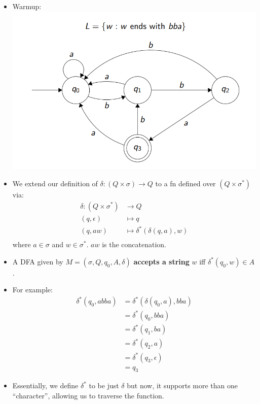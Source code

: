 \documentclass[12pt]{article}
\begin{document}
\begin{itemize}
    \item Warmup:\\
        \includegraphics[scale=0.5]{warmup.png}\\
    \item We extend our definition of $\delta : (Q \times \sigma) \rightarrow Q$ to a fn defined over $(Q \times \sigma^*)$ via:
        \begin{align*}
            \delta : (Q \times \sigma^*) &\rightarrow Q \\
            (q, \epsilon) &\mapsto q \\
            (q, aw) &\mapsto \delta^*(\delta(q, a), w) \\
        \end{align*}
    where $a \in \sigma$ and $w \in \sigma^*$.  $aw$ is the concatenation.
\item A DFA given by $M = (\sigma, Q, q_0, A, \delta)$ \textbf{accepts a string} $w$ iff $\delta^*(q_0, w) \in A$.
    \item For example:
        \begin{align*}
            \delta^*(q_0, abba) &= \delta^*(\delta(q_0, a), bba)\\
            &= \delta^*(q_0, bba) \\
            &= \delta^*(q_1, ba) \\
            &= \delta^*(q_2, a) \\
            &= \delta^*(q_3, \epsilon) \\
            &= q_3
        \end{align*}
    \item Essentially, we define $\delta^*$ to be just $\delta$ but now, it supports more than one ``character'', allowing us to traverse the function.

\end{itemize}
\end{document}
